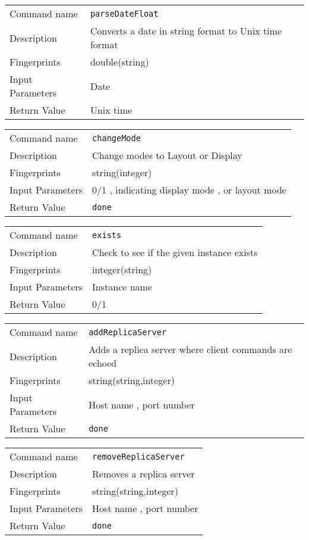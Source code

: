 \noindent
\begin{tabular}{l|p{5in}}
\hline
Command name &{\tt parseDateFloat }\\ 
Description &
 Converts a date in string format to Unix time format 
 	\\
Fingerprints & double(string)\\
Input Parameters& Date \\
Return Value& Unix time \\
\hline
\end{tabular}
\bigskip

\noindent
\begin{tabular}{l|p{5in}}
\hline
Command name &{\tt changeMode }\\ 
Description &
 Change modes to Layout or Display 
 	\\
Fingerprints & string(integer)\\
Input Parameters& 0/1 , indicating display mode , or layout mode \\
Return Value&{\tt done}\\
\hline
\end{tabular}
\bigskip

\noindent
\begin{tabular}{l|p{5in}}
\hline
Command name &{\tt exists }\\ 
Description &
 Check to see if the given instance exists 
 	\\
Fingerprints & integer(string)\\
Input Parameters& Instance name \\
Return Value& 0/1 \\
\hline
\end{tabular}
\bigskip

\noindent
\begin{tabular}{l|p{5in}}
\hline
Command name &{\tt addReplicaServer }\\ 
Description &
 Adds a replica server where client commands are echoed 
 	\\
Fingerprints & string(string,integer)\\
Input Parameters& Host name , port number \\
Return Value&{\tt done}\\
\hline
\end{tabular}
\bigskip

\noindent
\begin{tabular}{l|p{5in}}
\hline
Command name &{\tt removeReplicaServer }\\ 
Description &
 Removes a replica server 
 	\\
Fingerprints & string(string,integer)\\
Input Parameters& Host name , port number \\
Return Value&{\tt done}\\
\hline
\end{tabular}
\bigskip

